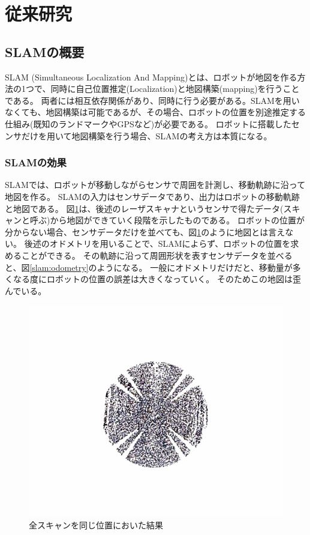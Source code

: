 \section{従来研究}
\subsection{SLAMの概要}
SLAM (Simultaneous Localization And Mapping)とは、ロボットが地図を作る方法の1つで、同時に自己位置推定(Localization)と地図構築(mapping)を行うことである。
両者には相互依存関係があり、同時に行う必要がある。SLAMを用いなくても、地図構築は可能であるが、その場合、ロボットの位置を別途推定する仕組み(既知のランドマークやGPSなど)が必要である。
ロボットに搭載したセンサだけを用いて地図構築を行う場合、SLAMの考え方は本質になる。

\subsubsection{SLAMの効果}
SLAMでは、ロボットが移動しながらセンサで周囲を計測し、移動軌跡に沿って地図を作る。
SLAMの入力はセンサデータであり、出力はロボットの移動軌跡と地図である。
図\ref{slam:scan}は、後述のレーザスキャナというセンサで得たデータ(スキャンと呼ぶ)から地図ができていく段階を示したものである。
ロボットの位置が分からない場合、センサデータだけを並べても、図\ref{slam:scan}のように地図とは言えない。
後述のオドメトリを用いることで、SLAMによらず、ロボットの位置を求めることができる。
その軌跡に沿って周囲形状を表すセンサデータを並べると、図\ref{slam:odometry}のようになる。
一般にオドメトリだけだと、移動量が多くなる度にロボットの位置の誤差は大きくなっていく。
そのためこの地図は歪んでいる。

\begin{figure}[h]
  \begin{center}
  \includegraphics[width=.8\linewidth]{img/slam_1.pdf}
  \caption{全スキャンを同じ位置においた結果}
  \label{slam:scan}
  \end{center}
\end{figure}

